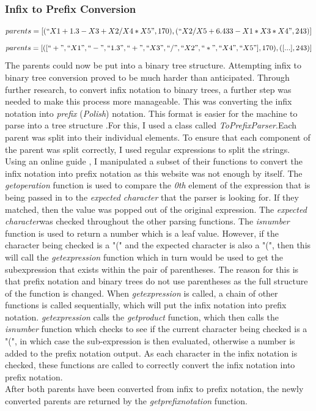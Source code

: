 \documentclass[11pt]{article}
\begin{document}
\subsubsection{Infix to Prefix Conversion}\label{subsubsec:I2P}
\begin{equation}parents = [(``X1+1.3-X3+X2/X4*X5",170),( ``X2/X5+6.433-X1*X3*X4",243)] \end{equation} \begin{equation}parents = [([``+", ``X1", ``-", ``1.3", ``+", ``X3", ``/", ``X2", ``*", ``X4", ``X5"], 170),([...],243)] \end{equation}
The parents could now be put into a binary tree structure. Attempting infix to binary tree conversion proved to be much harder than anticipated. Through further research, to convert infix notation to binary trees, a further step was needed to make this process more manageable. This was converting the infix notation into \textit{prefix} (\textit{Polish}) notation. This format is easier for the machine to parse into a tree structure .For this, I used a class called \textit{ToPrefixParser}.Each parent was split into their individual elements. To ensure that each component of the parent was split correctly, I used regular expressions to split the strings.
Using an online guide \cite{?}, I manipulated a subset of their functions to convert the infix notation into prefix notation as this website was not enough by itself. The \textit{get\textunderscore operation}  function is used to compare the \textit{0th} element of the expression that is being passed in to the \textit{expected character} that the parser is looking for. If they matched, then the value was popped out of the original expression. The \textit{expected character}was checked throughout the other parsing functions. The \textit{is\textunderscore number} function is used to return a number which is a leaf value. 
However, if the character being checked is a "(" and the expected character is also a "(", then this will call the \textit{get\textunderscore expression} function which in turn would be used to get the subexpression that exists within the pair of parentheses. The reason for this is that prefix notation and binary trees do not use parentheses as the full structure of the function is changed. When \textit{get\textunderscore expression} is called,  a chain of other functions is called sequentially, which will put the infix notation into prefix notation.
\textit{get\textunderscore expression} calls the \textit{get\textunderscore product} function, which then calls the \textit{is\textunderscore number} function which checks to see if the current character being checked is a "(", in which case the sub-expression is then evaluated, otherwise a number is added to the prefix notation output.  As each character in the infix notation is checked, these functions are called to correctly convert the infix notation into prefix notation. \\ 
After both parents have been converted from infix to prefix notation, the newly converted parents are returned by the \textit{get\textunderscore prefix\textunderscore notation} function.  
\end{document}
